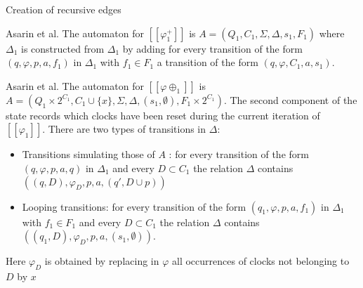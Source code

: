 \begin{frame}[fragile,shrink=5]{Creation of recursive edges}
    \begin{definition}Asarin et al.
        The automaton for $[\![\varphi^+_1 ]\!]$ is $A = (Q_1,C_1,\Sigma,\Delta,s_1,F_1)$ where $\Delta_1$ is constructed from $\Delta_1$ by adding
        for every transition of the form $(q,\varphi,p,a, f_1)$ in $\Delta_1$ with $f_1 \in F_1$ a transition of the form
        $(q,\varphi,C_1,a,s_1)$.
    \end{definition}
        
    \begin{definition}
        Asarin et al.
        The automaton for $[\![\varphi\oplus_1 ]\!]$ is $A = (Q_1 \times 2^{C_1}, C_1 \cup \{x\},\Sigma,\Delta,(s_1,\emptyset),F_1 \times 2^{C_1})$. The second component of the state records which clocks have been reset during the current iteration of $[\![\varphi_1]\!]$.
        There are two types of transitions in $\Delta$:
        \begin{itemize}
            \item Transitions simulating those of $A$ : for every transition of the form $(q,\varphi,p,a,q)$ in $\Delta_1$
            and every $D \subset C_1$ the relation $\Delta$ contains $((q,D),\varphi_D,p,a,(q',D\cup p))$
            \item Looping transitions: for every transition of the form $(q_1,\varphi,p,a, f_1)$ in $\Delta_1$ with $f_1 \in F_1$ and
            every $D \subset C_1$ the relation $\Delta$ contains $((q_1,D),\varphi_D,p,a,(s_1,\emptyset))$.
        \end{itemize}
        Here $\varphi_D$ is obtained by replacing in $\varphi$ all occurrences of clocks not belonging to $D$ by $x$
    \end{definition}
\end{frame}
    

